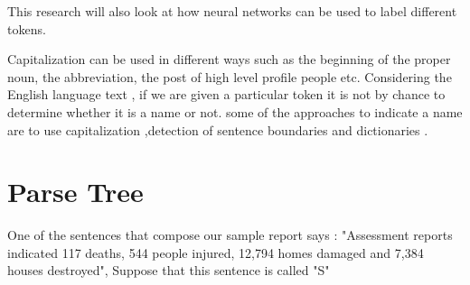This research will also look at how neural networks can be used to label different tokens.

Capitalization can be used in different ways such as the beginning of the proper noun, the abbreviation, the post of high level profile people etc. Considering the English language text , if we are given a  particular token it is not by chance  to  determine whether it is a name or not. some of the approaches to indicate a name are to  use capitalization ,detection of sentence boundaries and dictionaries \citep{baluja2000applying}.

\section{ Parse  Tree}
One of the sentences that compose our sample report says : 
"Assessment reports indicated 117 deaths, 544 people injured, 12,794 homes damaged and 7,384 houses destroyed", Suppose that this sentence is called "S"

